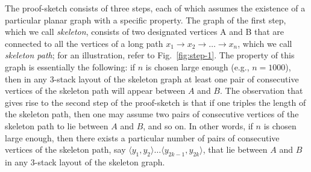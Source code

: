 \documentclass[runningheads]{llncs}
\begin{document}
The proof-sketch consists of three steps, each of which assumes the existence of a particular planar graph with a specific property. The graph of the first step, which we call \emph{skeleton}, consists of two designated vertices A and B that are connected to all the vertices of a long path $x_1 \rightarrow x_2 \rightarrow \ldots \rightarrow x_n$, which we call \emph{skeleton path}; for an illustration, refer to Fig.~\ref{fig:step-1}. The property of this graph is essentially the following: if $n$ is chosen large enough (e.g., $n=1000$), then in any $3$-stack layout of the skeleton graph at least one pair of consecutive vertices of the skeleton path will appear between $A$ and $B$. The observation that gives rise to the second step of the proof-sketch is that if one triples the length of the skeleton path, then one may assume two pairs of consecutive vertices of the skeleton path to lie between $A$ and $B$, and so on. In other words, if $n$ is chosen large enough, then there exists a particular number of pairs of consecutive vertices of the skeleton path, say $\langle y_1, y_2\rangle \ldots \langle y_{2k-1},y_{2k} \rangle$, that lie between $A$ and $B$ in any $3$-stack layout of the skeleton graph. 
\end{document}

